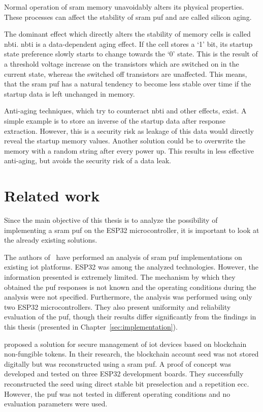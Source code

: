 Normal operation of \gls{sram} memory unavoidably alters its physical properties. These processes can affect the stability of \gls{sram} \gls{puf} and are called silicon aging.

The dominant effect which directly alters the stability of memory cells is called \gls{nbti}. \gls{nbti} is a data-dependent aging effect. If the cell stores a `1' bit, its startup state preference slowly starts to change towards the `0' state. This is the result of a threshold voltage increase on the transistors which are switched on in the current state, whereas the switched off transistors are unaffected. This means, that the \gls{sram} \gls{puf} has a natural tendency to become less stable over time if the startup data is left unchanged in memory.~\cite{Roelke2018}

Anti-aging techniques, which try to counteract \gls{nbti} and other effects, exist. A simple example is to store an inverse of the startup data after response extraction. However, this is a security risk as leakage of this data would directly reveal the startup memory values. Another solution could be to overwrite the memory with a random string after every power up. This results in less effective anti-aging, but avoids the security risk of a data leak.~\cite{Maes2014}

\section{Related work}

Since the main objective of this thesis is to analyze the possibility of implementing a \gls{sram} \gls{puf} on the ESP32 microcontroller, it is important to look at the already existing solutions.

The authors of~\cite{Deutschmann2018} have performed an analysis of \gls{sram} \gls{puf} implementations on existing \gls{iot} platforms. ESP32 was among the analyzed technologies. However, the information presented is extremely limited. The mechanism by which they obtained the \gls{puf} responses is not known and the operating conditions during the analysis were not specified. Furthermore, the analysis was performed using only two ESP32 microcontrollers. They also present uniformity and reliability evaluation of the \gls{puf}, though their results differ significantly from the findings in this thesis (presented in Chapter~\ref{sec:implementation}).

\cite{Javier2020} proposed a solution for secure management of \gls{iot} devices based on blockchain non-fungible tokens. In their research, the blockchain account seed was not stored digitally but was reconstructed using a \gls{sram} \gls{puf}. A proof of concept was developed and tested on three ESP32 development boards. They successfully reconstructed the seed using direct stable bit preselection and a repetition \gls{ecc}. However, the \gls{puf} was not tested in different operating conditions and no evaluation parameters were used.

